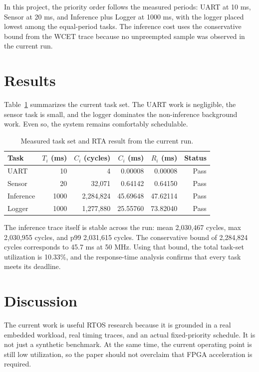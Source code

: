 \documentclass[journal]{IEEEtran}
\begin{document}
In this project, the priority order follows the measured periods: UART at 10 ms, Sensor at 20 ms, and Inference plus Logger at 1000 ms, with the logger placed lowest among the equal-period tasks. The inference cost uses the conservative bound from the WCET trace because no unpreempted sample was observed in the current run.

\section{Results}
Table~\ref{tab:taskset} summarizes the current task set. The UART work is negligible, the sensor task is small, and the logger dominates the non-inference background work. Even so, the system remains comfortably schedulable.

\begin{table}[!t]
\caption{Measured task set and RTA result from the current run.}
\label{tab:taskset}
\centering
\begin{tabular}{lrrrrr}
\hline
Task & $T_i$ (ms) & $C_i$ (cycles) & $C_i$ (ms) & $R_i$ (ms) & Status \\
\hline
UART & 10 & 4 & 0.00008 & 0.00008 & Pass \\
Sensor & 20 & 32,071 & 0.64142 & 0.64150 & Pass \\
Inference & 1000 & 2,284,824 & 45.69648 & 47.62114 & Pass \\
Logger & 1000 & 1,277,880 & 25.55760 & 73.82040 & Pass \\
\hline
\end{tabular}
\end{table}

The inference trace itself is stable across the run: mean 2,030,467 cycles, max 2,030,955 cycles, and p99 2,031,615 cycles. The conservative bound of 2,284,824 cycles corresponds to 45.7 ms at 50 MHz. Using that bound, the total task-set utilization is 10.33\%, and the response-time analysis confirms that every task meets its deadline.

\section{Discussion}
The current work is useful RTOS research because it is grounded in a real embedded workload, real timing traces, and an actual fixed-priority schedule. It is not just a synthetic benchmark. At the same time, the current operating point is still low utilization, so the paper should not overclaim that FPGA acceleration is required.
\end{document}
